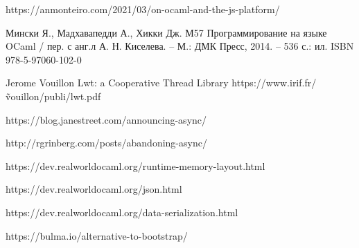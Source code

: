 \begin{thebibliography}{00}
    https://anmonteiro.com/2021/03/on-ocaml-and-the-js-platform/ \TODO

    Мински Я., Мадхавапедди А., Хикки Дж.
    М57 Программирование на языке OCaml / пер. с анг.л А. Н. Киселева. –
    М.: ДМК Пресс, 2014. – 536 с.: ил.
    ISBN 978-5-97060-102-0
    \TODO

    Jerome Vouillon Lwt: a Cooperative Thread Library \TODO
    https://www.irif.fr/\~vouillon/publi/lwt.pdf

    https://blog.janestreet.com/announcing-async/ \TODO

    http://rgrinberg.com/posts/abandoning-async/ \TODO

    https://dev.realworldocaml.org/runtime-memory-layout.html \TODO

    https://dev.realworldocaml.org/json.html \TODO

    https://dev.realworldocaml.org/data-serialization.html \TODO

    https://bulma.io/alternative-to-bootstrap/ \TODO

\end{thebibliography}
\endgroup

